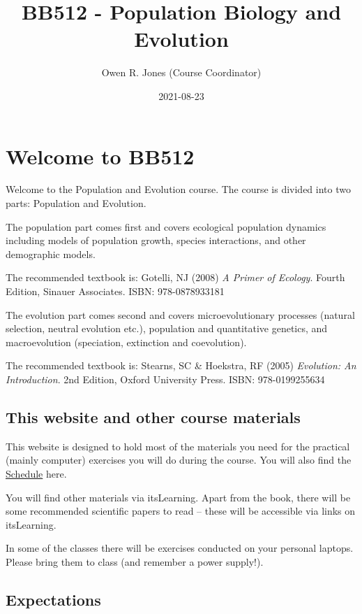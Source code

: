 \documentclass[
  a4paper]{book}
\title{BB512 - Population Biology and Evolution}
\author{Owen R. Jones (Course Coordinator)}
\date{2021-08-23}
\begin{document}
\frontmatter
\maketitle

\mainmatter
\hypertarget{welcome-to-bb512}{%
\chapter{Welcome to BB512}\label{welcome-to-bb512}}

Welcome to the Population and Evolution course. The course is divided
into two parts: Population and Evolution.

The population part comes first and covers ecological population
dynamics including models of population growth, species interactions,
and other demographic models.

The recommended textbook is: Gotelli, NJ (2008) \emph{A Primer of
Ecology}. Fourth Edition, Sinauer Associates. ISBN: 978-0878933181

The evolution part comes second and covers microevolutionary processes
(natural selection, neutral evolution etc.), population and quantitative
genetics, and macroevolution (speciation, extinction and coevolution).

The recommended textbook is: Stearns, SC \& Hoekstra, RF (2005)
\emph{Evolution: An Introduction}. 2nd Edition, Oxford University Press.
ISBN: 978-0199255634

\hypertarget{this-website-and-other-course-materials}{%
\section{This website and other course
materials}\label{this-website-and-other-course-materials}}

This website is designed to hold most of the materials you need for the
practical (mainly computer) exercises you will do during the course. You
will also find the
\href{https://jonesor.github.io/BB512_Book/schedule.html}{Schedule}
here.

You will find other materials via itsLearning. Apart from the book,
there will be some recommended scientific papers to read -- these will
be accessible via links on itsLearning.

In some of the classes there will be exercises conducted on your
personal laptops. Please bring them to class (and remember a power
supply!).

\hypertarget{expectations}{%
\section{Expectations}\label{expectations}}
\end{document}
